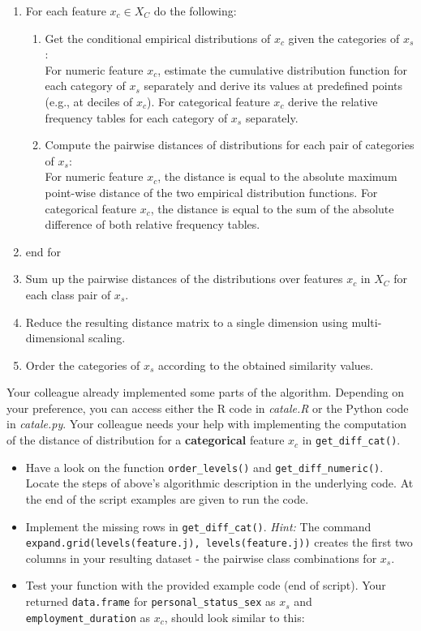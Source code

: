 {\begin{enumerate}[a)]
\begin{enumerate}[1)]
  \item For each feature $x_c \in X_C$ do the following: 
  \begin{enumerate}
    \item Get the conditional empirical distributions of $x_c$ given the categories of $x_s$: \\
     For numeric feature $x_c$, estimate the cumulative distribution function for each category of $x_s$ separately and derive its values at predefined points (e.g., at deciles of $x_c$). 
     For categorical feature $x_c$ derive the relative frequency tables for each category of $x_s$ separately.
    \item Compute the pairwise distances of distributions for each pair of categories of $x_s$:\\ 
    For numeric feature $x_c$, the distance is equal to the absolute maximum point-wise distance of the two empirical distribution functions. For categorical feature $x_c$, the distance is equal to the sum of the absolute difference of both relative frequency tables.   
  \end{enumerate}
  \item end for
  \item Sum up the pairwise distances of the distributions over features $x_c$ in $X_C$ for each class pair of $x_s$. 
  \item Reduce the resulting distance matrix to a single dimension using multi-dimensional scaling.
  \item Order the categories of $x_s$ according to the obtained similarity values.
\end{enumerate}

Your colleague already implemented some parts of the algorithm. Depending on your 
preference, you can access either the R code in \textit{catale.R} or the 
Python code in \textit{catale.py}.
Your colleague needs your help with implementing the computation of the distance of 
distribution for a \textbf{categorical} feature $x_c$ in 
\texttt{get\_diff\_cat()}. 

\begin{itemize}
  \item Have a look on the function \texttt{order\_levels()} and \texttt{get\_diff\_numeric()}. 
  Locate the steps of above's  algorithmic description in the underlying code.
  At the end of the script examples are given to run the code. 
  \item Implement the missing rows in \texttt{get\_diff\_cat()}.
  \textit{Hint:} The command \texttt{expand.grid(levels(feature.j), levels(feature.j))} creates the first two columns in 
your resulting dataset - the pairwise class combinations for $x_s$.
  \item Test your function with the provided example code (end of script). 
  Your returned \texttt{data.frame} for \texttt{personal\_status\_sex} as $x_s$ 
  and \texttt{employment\_duration} as $x_c$, should look 
  similar to this: 


\end{itemize}
\end{enumerate}}
